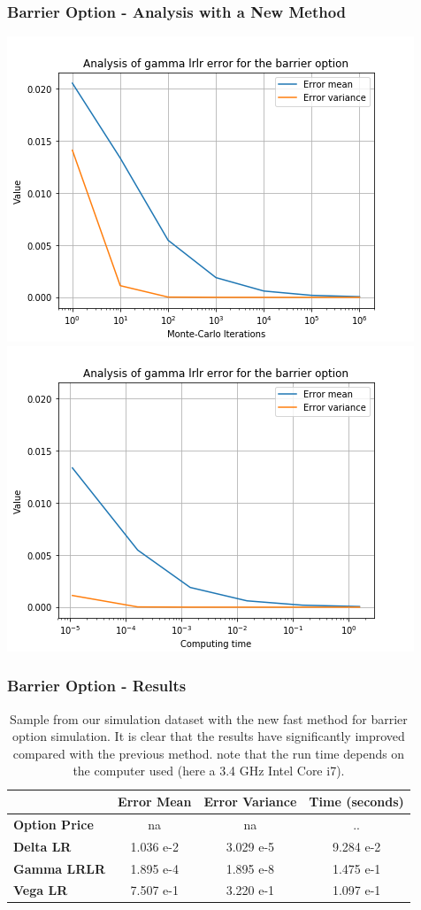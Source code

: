 \documentclass[12pt]{beamer}
\begin{document}
\begin{frame}
\frametitle{Barrier Option - Analysis with a New Method}
\includegraphics[width=.5\textwidth]{graphs/barriergammalrlr.png}
\includegraphics[width=.5\textwidth]{graphs/barriergammalrlrtime.png}
\end{frame}

\begin{frame}
\frametitle{Barrier Option - Results}
\begin{table}
\centering
\begin{tabular}{|l|c|c|c|}
\hline
    & \textbf{Error Mean} & \textbf{Error Variance} & \textbf{Time (seconds)} \\ \hline
\textbf{Option Price} & na &          na         & .. \\ \hline
\textbf{Delta LR} & 1.036 e-2 & 3.029 e-5 & 9.284 e-2\\ \hline
\textbf{Gamma LRLR} & 1.895 e-4 & 1.895 e-8& 1.475 e-1\\ \hline
\textbf{Vega LR} & 7.507 e-1 & 3.220 e-1 & 1.097 e-1\\ \hline
\end{tabular}
\caption{Sample from our simulation dataset with the new fast method for barrier option simulation. It is clear that the results have significantly improved compared with the previous method. note that the run time depends on the computer used (here a 3.4 GHz Intel Core i7).}
\end{table}

\end{frame}
\end{document}
